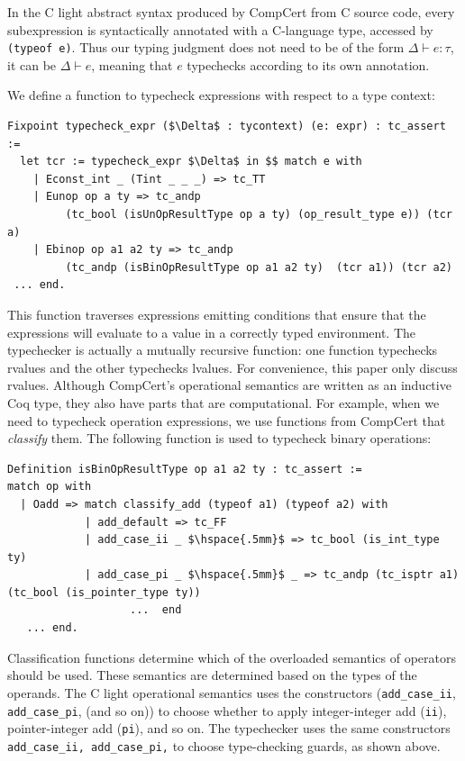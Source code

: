 \documentclass{puthesis}
\begin{document}
In the C light abstract syntax produced by CompCert from C source code,
every subexpression is syntactically annotated
with a C-language type, accessed by \lstinline{(typeof e)}. 
Thus our typing judgment does not need to be of the
form $\Delta \vdash e : \tau$, it can be
$\Delta \vdash e $, meaning that $e$ typechecks according to its
own annotation.

We define a function to typecheck expressions with respect to a type context:

\begin{lstlisting}
Fixpoint typecheck_expr ($\Delta$ : tycontext) (e: expr) : tc_assert :=
  let tcr := typecheck_expr $\Delta$ in $$ match e with
    | Econst_int _ (Tint _ _ _) => tc_TT 
    | Eunop op a ty => tc_andp 
         (tc_bool (isUnOpResultType op a ty) (op_result_type e)) (tcr a) 
    | Ebinop op a1 a2 ty => tc_andp 
         (tc_andp (isBinOpResultType op a1 a2 ty)  (tcr a1)) (tcr a2)
 ... end.
\end{lstlisting}

\noindent This function traverses expressions emitting
conditions that ensure that the expressions will evaluate to a value in a
correctly typed environment. The typechecker is actually a mutually
recursive function: one function typechecks rvalues and the other
typechecks lvalues.  For convenience, this paper only discuss rvalues. 
Although CompCert's operational semantics are written
as an inductive Coq type, they also have parts that are computational. For
example, when we need to typecheck operation expressions, we use functions from
CompCert that \emph{classify} them. The following function is used to typecheck
binary operations:
\pagebreak
\begin{lstlisting}
Definition isBinOpResultType op a1 a2 ty : tc_assert :=
match op with
  | Oadd => match classify_add (typeof a1) (typeof a2) with 
            | add_default => tc_FF
            | add_case_ii _ $\hspace{.5mm}$ => tc_bool (is_int_type ty) 
            | add_case_pi _ $\hspace{.5mm}$ _ => tc_andp (tc_isptr a1) (tc_bool (is_pointer_type ty)) 
                   ...  end   
   ... end.
\end{lstlisting}

Classification functions determine which of the overloaded semantics
of operators should be used. These semantics are determined based on the types
of the operands. 
The C light operational semantics uses
the constructors (\lstinline|add_case_ii|, \lstinline|add_case_pi|, (and so on))
to choose whether to apply integer-integer add (\lstinline|ii|),
pointer-integer add (\lstinline|pi|), and so on.
The typechecker uses the same constructors
\lstinline{add_case_ii, add_case_pi,} to choose
type-checking guards, as shown above.
\end{document}
